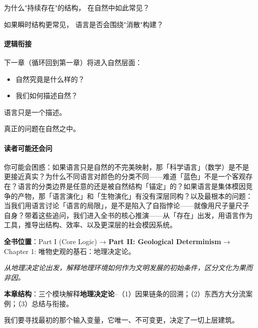 \documentclass[openany, a4paper, 12pt]{book}
\begin{document}
为什么"持续存在"的结构，
在自然中如此常见？

如果瞬时结构更常见，
语言是否会围绕"消散"构建？

\paragraph{逻辑衔接}

下一章（循环回到第一章）将进入自然层面：

\begin{itemize}
	\item 自然究竟是什么样的？
	\item 我们如何描述自然？

\end{itemize}

语言只是一个描述。

真正的问题在自然之中。

\paragraph*{读者可能还会问}
你可能会困惑：如果语言只是自然的不完美映射，那「科学语言」（数学）是不是更接近真实？为什么不同语言对颜色的分类不同——难道「蓝色」不是一个客观存在？语言的分类边界是任意的还是被自然结构「锚定」的？如果语言是集体模因竞争的产物，那「语言演化」和「生物演化」有没有深层同构？以及最根本的问题：当我们用语言讨论「语言的局限」，是不是陷入了自指悖论——就像用尺子量尺子自身？带着这些追问，我们进入全书的核心推演——从「存在」出发，用语言作为工具，推导出结构、效率、以及更深层的社会模因系统。




	\textbf{\large 全书位置}：Part I (Core Logic) → \textbf{Part II: Geological Determinism} → Chapter 1: 唯物史观的基石：地理决定论。

	\textit{从地理决定论出发，解释地理环境如何作为文明发展的初始条件，区分文化为果而非因。}

	\vspace{1em}

	\textbf{\large 本章结构}：三个模块解释\textbf{地理决定论}--（1）因果链条的回溯；（2）东西方大分流案例；（3）总结与衔接。

	\vspace{1em}

我们要寻找最初的那个输入变量，它唯一、不可变更，决定了一切上层建筑。
\end{document}
